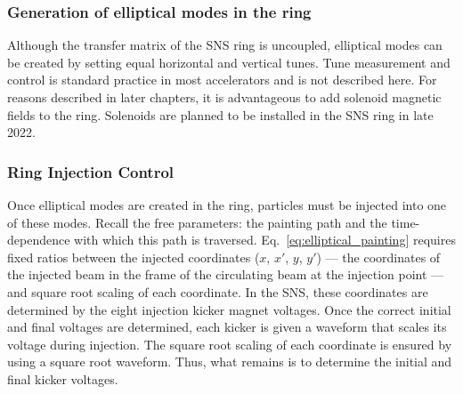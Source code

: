 \subsubsection{Generation of elliptical modes in the ring}

Although the transfer matrix of the SNS ring is uncoupled, elliptical modes can be created by setting equal horizontal and vertical tunes. Tune measurement and control is standard practice in most accelerators \cite{book:Minty2003} and is not described here. For reasons described in later chapters, it is advantageous to add solenoid magnetic fields to the ring. Solenoids are planned to be installed in the SNS ring in late 2022.


\subsubsection{Ring Injection Control}

Once elliptical modes are created in the ring, particles must be injected into one of these modes. Recall the free parameters: the painting path and the time-dependence with which this path is traversed. Eq.~\ref{eq:elliptical_painting} requires fixed ratios between the injected coordinates ($x$, $x'$, $y$, $y'$) — the coordinates of the injected beam in the frame of the circulating beam at the injection point — and square root scaling of each coordinate. In the SNS, these coordinates are determined by the eight injection kicker magnet voltages. Once the correct initial and final voltages are determined, each kicker is given a waveform that scales its voltage during injection. The square root scaling of each coordinate is ensured by using a square root waveform. Thus, what remains is to determine the initial and final kicker voltages. 

